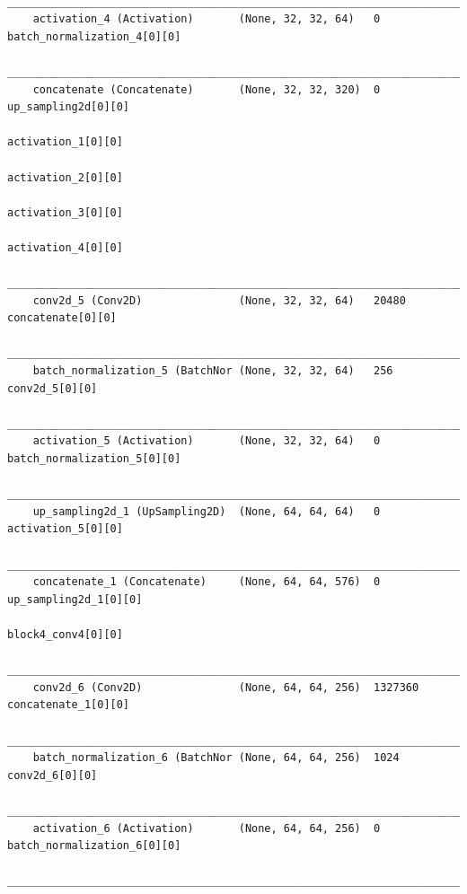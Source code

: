 {\begin{verbatim}
    __________________________________________________________________________________________________
    activation_4 (Activation)       (None, 32, 32, 64)   0           batch_normalization_4[0][0]      
    __________________________________________________________________________________________________
    concatenate (Concatenate)       (None, 32, 32, 320)  0           up_sampling2d[0][0]              
                                                                        activation_1[0][0]               
                                                                        activation_2[0][0]               
                                                                        activation_3[0][0]               
                                                                        activation_4[0][0]               
    __________________________________________________________________________________________________
    conv2d_5 (Conv2D)               (None, 32, 32, 64)   20480       concatenate[0][0]                
    __________________________________________________________________________________________________
    batch_normalization_5 (BatchNor (None, 32, 32, 64)   256         conv2d_5[0][0]                   
    __________________________________________________________________________________________________
    activation_5 (Activation)       (None, 32, 32, 64)   0           batch_normalization_5[0][0]      
    __________________________________________________________________________________________________
    up_sampling2d_1 (UpSampling2D)  (None, 64, 64, 64)   0           activation_5[0][0]               
    __________________________________________________________________________________________________
    concatenate_1 (Concatenate)     (None, 64, 64, 576)  0           up_sampling2d_1[0][0]            
                                                                        block4_conv4[0][0]               
    __________________________________________________________________________________________________
    conv2d_6 (Conv2D)               (None, 64, 64, 256)  1327360     concatenate_1[0][0]              
    __________________________________________________________________________________________________
    batch_normalization_6 (BatchNor (None, 64, 64, 256)  1024        conv2d_6[0][0]                   
    __________________________________________________________________________________________________
    activation_6 (Activation)       (None, 64, 64, 256)  0           batch_normalization_6[0][0]      
    __________________________________________________________________________________________________

\end{verbatim}}
